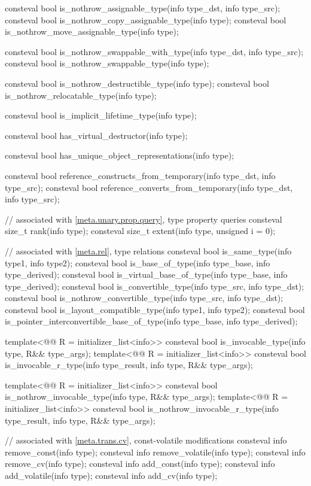 \begin{codeblock}
{  consteval bool is_nothrow_assignable_type(info type_dst, info type_src);
  consteval bool is_nothrow_copy_assignable_type(info type);
  consteval bool is_nothrow_move_assignable_type(info type);

  consteval bool is_nothrow_swappable_with_type(info type_dst, info type_src);
  consteval bool is_nothrow_swappable_type(info type);

  consteval bool is_nothrow_destructible_type(info type);
  consteval bool is_nothrow_relocatable_type(info type);

  consteval bool is_implicit_lifetime_type(info type);

  consteval bool has_virtual_destructor(info type);

  consteval bool has_unique_object_representations(info type);

  consteval bool reference_constructs_from_temporary(info type_dst, info type_src);
  consteval bool reference_converts_from_temporary(info type_dst, info type_src);

  // associated with \ref{meta.unary.prop.query}, type property queries
  consteval size_t rank(info type);
  consteval size_t extent(info type, unsigned i = 0);

  // associated with \ref{meta.rel}, type relations
  consteval bool is_same_type(info type1, info type2);
  consteval bool is_base_of_type(info type_base, info type_derived);
  consteval bool is_virtual_base_of_type(info type_base, info type_derived);
  consteval bool is_convertible_type(info type_src, info type_dst);
  consteval bool is_nothrow_convertible_type(info type_src, info type_dst);
  consteval bool is_layout_compatible_type(info type1, info type2);
  consteval bool is_pointer_interconvertible_base_of_type(info type_base, info type_derived);

  template<@@ R = initializer_list<info>>
    consteval bool is_invocable_type(info type, R&& type_args);
  template<@@ R = initializer_list<info>>
    consteval bool is_invocable_r_type(info type_result, info type, R&& type_args);

  template<@@ R = initializer_list<info>>
    consteval bool is_nothrow_invocable_type(info type, R&& type_args);
  template<@@ R = initializer_list<info>>
    consteval bool is_nothrow_invocable_r_type(info type_result, info type, R&& type_args);

  // associated with \ref{meta.trans.cv}, const-volatile modifications
  consteval info remove_const(info type);
  consteval info remove_volatile(info type);
  consteval info remove_cv(info type);
  consteval info add_const(info type);
  consteval info add_volatile(info type);
  consteval info add_cv(info type);

}
\end{codeblock}
